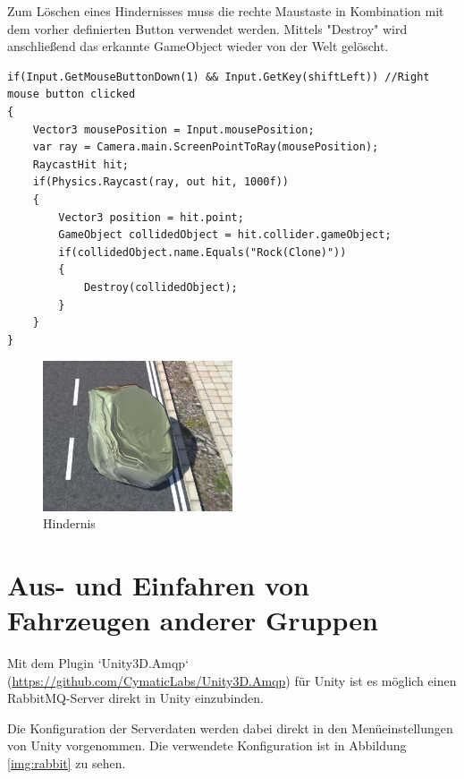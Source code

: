 Zum Löschen eines Hindernisses muss die rechte Maustaste in Kombination mit dem vorher definierten Button verwendet werden. Mittels "Destroy" wird anschließend das erkannte GameObject wieder von der Welt gelöscht.

\begin{lstlisting}[caption={Zerstören des Hindernisses},label={lst:Hinderniss_zerstören}]
if(Input.GetMouseButtonDown(1) && Input.GetKey(shiftLeft)) //Right mouse button clicked
{
	Vector3 mousePosition = Input.mousePosition;
	var ray = Camera.main.ScreenPointToRay(mousePosition);
	RaycastHit hit;
	if(Physics.Raycast(ray, out hit, 1000f))
	{
		Vector3 position = hit.point;
		GameObject collidedObject = hit.collider.gameObject;
		if(collidedObject.name.Equals("Rock(Clone)"))
		{
			Destroy(collidedObject);
		}
	}
}
\end{lstlisting}

\begin{figure}[H]
\begin{center}
\includegraphics[width=0.5\textwidth]{BilderAllgemein/rock.PNG}
\end{center}
	\caption{Hindernis}
	\label{img:hindernis}
\end{figure}

\section{Aus- und Einfahren von Fahrzeugen anderer Gruppen}
\label{Aus-_und_Einfahren_von_Fahrzeugen_anderer_Gruppen}

Mit dem Plugin `Unity3D.Amqp` (\url{https://github.com/CymaticLabs/Unity3D.Amqp}) für Unity ist es möglich einen RabbitMQ-Server direkt in Unity einzubinden.

Die Konfiguration der Serverdaten werden dabei direkt in den Menüeinstellungen von Unity vorgenommen. Die verwendete Konfiguration ist in Abbildung \ref{img:rabbit} zu sehen.

